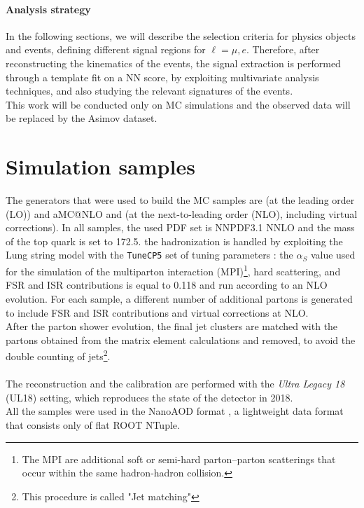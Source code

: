 \paragraph*{Analysis strategy}
In the following sections, we will describe the selection criteria for physics objects and events, defining different signal regions for $\ell=\mu,e$.
Therefore, after reconstructing the kinematics of the events, the signal extraction is performed through a template fit on a NN score, by exploiting multivariate analysis techniques, and also studying the relevant signatures of the events.\\
This work will be conducted only on MC simulations and the observed data will be replaced by the Asimov dataset.



\section{Simulation samples}
The generators that were used to build the MC samples are  (at the leading order (LO)) and aMC@NLO and  (at the next-to-leading order (NLO), including virtual corrections). In all samples, the used PDF set is NNPDF3.1 NNLO and the mass of the top quark is set to 172.5\GeV. the hadronization is handled by  exploiting the Lung string model with the \texttt{TuneCP5} set of tuning parameters \cite{Sirunyan2020ExtractionMeasurements}: the $\alpha_S$ value used for the simulation of the multiparton interaction (MPI)\footnote{The MPI are additional soft or semi-hard parton–parton scatterings that occur within the same hadron-hadron collision.}, hard scattering, and FSR and ISR contributions is equal to 0.118 and run according to an NLO evolution.
For each sample, a different number of additional partons is generated to include FSR and ISR contributions and virtual corrections at NLO.
\\
After the parton shower evolution, the final jet clusters are matched with the partons obtained from the matrix element calculations and removed, to avoid the double counting of jets\footnote{This procedure is called "Jet matching"}.
\\
\\
The reconstruction and the calibration are performed with the \textit{Ultra Legacy 18} (UL18) setting, which reproduces the state of the detector in 2018.\\
All the samples were used in the NanoAOD format \cite{Liu2020TheCMS}, a lightweight data format that consists only of flat ROOT NTuple.
